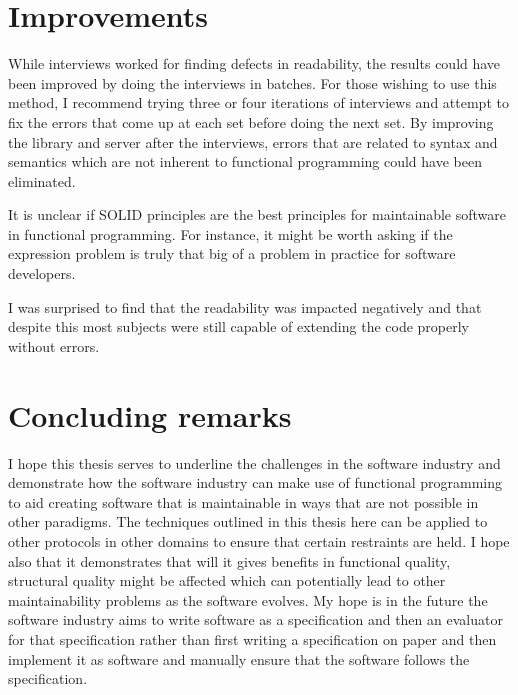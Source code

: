\section{Improvements}

While interviews worked for finding defects in readability, the results could
have been improved by doing the interviews in batches. For those wishing to use
this method, I recommend trying three or four iterations of interviews and
attempt to fix the errors that come up at each set before doing the next set. By
improving the library and server after the interviews, errors that are related
to syntax and semantics which are not inherent to functional programming could
have been eliminated.

It is unclear if SOLID principles are the best principles for maintainable
software in functional programming. For instance, it might be worth asking if
the expression problem is truly that big of a problem in practice for software
developers.

I was surprised to find that the readability was impacted negatively and that
despite this most subjects were still capable of extending the code properly
without errors.

\section{Concluding remarks}

I hope this thesis serves to underline the challenges in the software industry
and demonstrate how the software industry can make use of functional programming
to aid creating software that is maintainable in ways that are not possible in
other paradigms. The techniques outlined in this thesis here can be applied to
other protocols in other domains to ensure that certain restraints are held. I
hope also that it demonstrates that will it gives benefits in functional
quality, structural quality might be affected which can potentially lead to
other maintainability problems as the software evolves. My hope is in the future
the software industry aims to write software as a specification and then an
evaluator for that specification rather than first writing a specification on
paper and then implement it as software and manually ensure that the software
follows the specification. 
